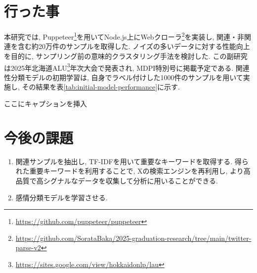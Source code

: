 \documentclass{jabstract}
\begin{document}
\begin{multicols}{2}
\section{行った事}
本研究では, Puppeteer\footnote{\url{https://github.com/puppeteer/puppeteer}}を用いてNode.js上にWebクローラ\footnote{\url{https://github.com/SorataBaka/2025-graduation-research/tree/main/twitter-parse-v2}}を実装し, 関連・非関連を含む約20万件のサンプルを取得した. ノイズの多いデータに対する性能向上を目的に, サンプリング前の意味的クラスタリング手法を検討した. この副研究は2025年北海道ALU\footnote{\url{https://sites.google.com/view/hokkaidonlp/lau}}年次大会で発表され, MDPI特別号に掲載予定である. 関連性分類モデルの初期学習は, 自身でラベル付けした1000件のサンプルを用いて実施し, その結果を表\ref{tab:initial-model-performance}に示す. 
\begin{tablehere}
  \noindent
  \parbox{\linewidth}{
    \centering
    \caption{ここにキャプションを挿入}\label{tab:initial-model-performance}
  }%
\end{tablehere}
\section{今後の課題}
\begin{enumerate}
\item 関連サンプルを抽出し, TF-IDFを用いて重要なキーワードを取得する. 得られた重要キーワードを利用することで, Xの検索エンジンを再利用し, より高品質で高シグナルなデータを収集して分析に用いることができる.
\item 感情分類モデルを学習させる.
\end{enumerate}
{\small


}



\end{multicols}
\end{document}
